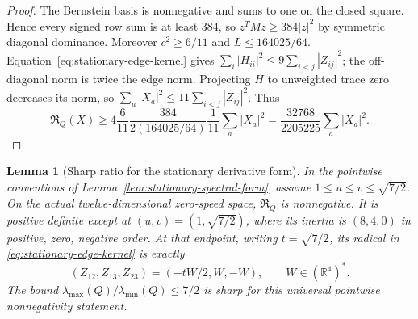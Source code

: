 \documentclass[11pt]{article}
\numberwithin{equation}{section}
\newtheorem{lemma}[theorem]{Lemma}
\theoremstyle{definition}
\theoremstyle{remark}
\begin{document}
\begin{proof}
The Bernstein basis is nonnegative and sums to one on the
closed square. Hence every signed row sum is at least $384$,
so $z^TMz\ge384|z|^2$ by symmetric diagonal dominance.
Moreover $c^2\ge6/11$ and $L\le164025/64$.
Equation~\eqref{eq:stationary-edge-kernel} gives
$\sum_i|H_{ii}|^2\le9\sum_{i<j}|Z_{ij}|^2$; the off-diagonal
norm is twice the edge norm. Projecting $H$ to unweighted
trace zero decreases its norm, so
$\sum_a|X_a|^2\le11\sum_{i<j}|Z_{ij}|^2$.
Thus
\[
 \mathfrak R_Q(X)\ge
 4\frac6{11}\frac{384}{2(164025/64)}\frac1{11}
       \sum_a|X_a|^2
 =\frac{32768}{2205225}\sum_a|X_a|^2.
\]
\end{proof}

\begin{lemma}[Sharp ratio for the stationary derivative form]
\label{lem:sharp-stationary-form}
In the pointwise conventions of
Lemma~\ref{lem:stationary-spectral-form}, assume
\(1\le u\le v\le\sqrt{7/2}\).
On the actual twelve-dimensional zero-speed space,
\(\mathfrak R_Q\) is nonnegative. It is positive definite
except at \((u,v)=(1,\sqrt{7/2})\), where its inertia is
\((8,4,0)\) in positive, zero, negative order.
At that endpoint, writing \(t=\sqrt{7/2}\), its radical in
\eqref{eq:stationary-edge-kernel} is exactly
\[
 (Z_{12},Z_{13},Z_{23})=(-tW/2,W,-W),\qquad W\in(\mathbb R^4)^*.
\]
The bound \(\lambda_{\max}(Q)/\lambda_{\min}(Q)\le7/2\)
is sharp for this universal pointwise nonnegativity statement.
\end{lemma}
\end{document}

